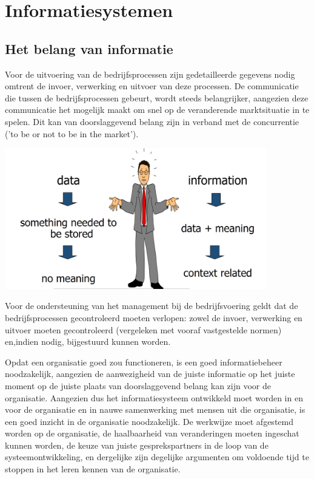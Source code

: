 \section{Informatiesystemen}

\subsection{Het belang van informatie}


Voor de uitvoering van de bedrijfsprocessen zijn gedetailleerde gegevens nodig omtrent de invoer, verwerking en uitvoer van deze processen. De communicatie die tussen de bedrijfsprocessen gebeurt, wordt steeds belangrijker, aangezien deze communicatie het mogelijk maakt om snel op de veranderende marktsituatie in te spelen. Dit kan van doorslaggevend belang zijn in verband met de concurrentie ('to be or not to be in the market').

\begin{center}
\includegraphics[width=4.5in]{img/theimportanceofinformation}%
\end{center}

Voor de ondersteuning van het management bij de bedrijfsvoering geldt dat de bedrijfsprocessen gecontroleerd moeten verlopen: zowel de invoer, verwerking en uitvoer moeten gecontroleerd (vergeleken met vooraf vastgestelde normen) en,indien nodig, bijgestuurd kunnen worden.

Opdat een organisatie goed zou functioneren, is een goed informatiebeheer noodzakelijk, aangezien de aanwezigheid van de juiste informatie op het juiste moment op de juiste plaats van doorslaggevend belang kan zijn voor de organisatie. Aangezien dus het informatiesysteem ontwikkeld moet worden in en voor de organisatie en in nauwe samenwerking met mensen uit die organisatie, is een goed inzicht in de organisatie noodzakelijk. De werkwijze moet afgestemd worden op de organisatie, de haalbaarheid van veranderingen moeten ingeschat kunnen worden, de keuze van juiste gesprekspartners in de loop van de systeemontwikkeling, en dergelijke zijn degelijke argumenten om voldoende tijd te stoppen in het leren kennen van de organisatie.

